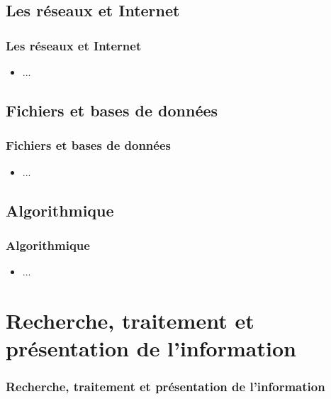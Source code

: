 \documentclass{beamer}
\begin{document}
\def\titleSection1Subsection3{Les r{\'e}seaux et Internet}
\subsection{ \titleSection1Subsection3 }
\begin{frame}
	\frametitle{ \titleSection1Subsection3 }
	\begin{itemize}
		\item ... 
	\end{itemize}
\end{frame}

\def\titleSection1Subsection4{Fichiers et bases de donn{\'e}es}
\subsection{ \titleSection1Subsection4 }
\begin{frame}
	\frametitle{ \titleSection1Subsection4 }
	\begin{itemize}
		\item ... 
	\end{itemize}
\end{frame}

\def\titleSection1Subsection5{Algorithmique}
\subsection{ \titleSection1Subsection5 }
\begin{frame}
	\frametitle{ \titleSection1Subsection5 }
	\begin{itemize}
		\item ... 
	\end{itemize}
\end{frame}


\def\titleSection2{Recherche, traitement et pr{\'e}sentation de l'information}
\section{ \titleSection2 }
\begin{frame}
	\frametitle{ \titleSection2 }
	\tableofcontents[sections=2,currentsection,subsectionstyle=show/shaded/hide]
\end{frame} 

\def\titleSection2SubsectionI{Interrogation d'une banque de donn{\'e}es bibliographiques}
\end{document}
